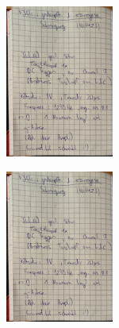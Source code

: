 \begin{minipage}[t]{0.4\textwidth}
    \includegraphics[height=5cm, page=5]{Inhalte/v354_messdaten.pdf}
\end{minipage}

\begin{minipage}[t]{0.4\textwidth}
    \includegraphics[height=5cm, page=6]{Inhalte/v354_messdaten.pdf}
\end{minipage}